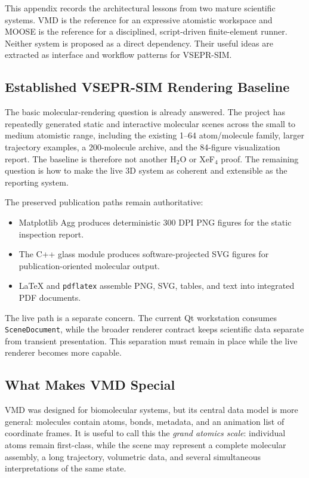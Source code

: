 \documentclass[11pt,a4paper]{article}
\begin{document}
This appendix records the architectural lessons from two mature scientific
systems.  VMD is the reference for an expressive atomistic workspace and
MOOSE is the reference for a disciplined, script-driven finite-element
runner.  Neither system is proposed as a direct dependency.  Their useful
ideas are extracted as interface and workflow patterns for VSEPR-SIM.

\subsection{Established VSEPR-SIM Rendering Baseline}

The basic molecular-rendering question is already answered.  The project has
repeatedly generated static and interactive molecular scenes across the small
to medium atomistic range, including the existing 1--64 atom/molecule family,
larger trajectory examples, a 200-molecule archive, and the 84-figure
visualization report.  The baseline is therefore not another H$_2$O or XeF$_4$
proof.  The remaining question is how to make the live 3D system as coherent
and extensible as the reporting system.

The preserved publication paths remain authoritative:

\begin{itemize}
  \item Matplotlib Agg produces deterministic 300 DPI PNG figures for the
        static inspection report.
  \item The C++ glass module produces software-projected SVG figures for
        publication-oriented molecular output.
  \item LaTeX and \texttt{pdflatex} assemble PNG, SVG, tables, and text into
        integrated PDF documents.
\end{itemize}

The live path is a separate concern.  The current Qt workstation consumes
\texttt{SceneDocument}, while the broader renderer contract keeps
scientific data separate from transient presentation.  This separation must
remain in place while the live renderer becomes more capable.

\subsection{What Makes VMD Special}

VMD was designed for biomolecular systems, but its central data model is
more general: molecules contain atoms, bonds, metadata, and an animation list
of coordinate frames.  It is useful to call this the \emph{grand atomics
scale}: individual atoms remain first-class, while the scene may represent a
complete molecular assembly, a long trajectory, volumetric data, and several
simultaneous interpretations of the same state.
\end{document}
